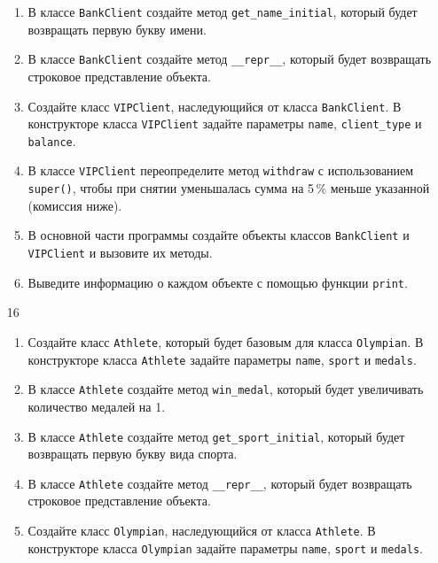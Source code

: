 \begin{enumerate}
\begin{enumerate}
    \item В классе \texttt{BankClient} создайте метод \texttt{get\_name\_initial}, который будет возвращать первую букву имени.
    
    \item В классе \texttt{BankClient} создайте метод \texttt{\_\_repr\_\_}, который будет возвращать строковое представление объекта.
    
    \item Создайте класс \texttt{VIPClient}, наследующийся от класса \texttt{BankClient}. В конструкторе класса \texttt{VIPClient} задайте параметры \texttt{name}, \texttt{client\_type} и \texttt{balance}.
    
    \item В классе \texttt{VIPClient} переопределите метод \texttt{withdraw} с использованием \texttt{super()}, чтобы при снятии уменьшалась сумма на 5\,\% меньше указанной (комиссия ниже).
    
    \item В основной части программы создайте объекты классов \texttt{BankClient} и \texttt{VIPClient} и вызовите их методы.
    
    \item Выведите информацию о каждом объекте с помощью функции \texttt{print}.
\end{enumerate}

\item[16] 
\begin{enumerate}
    \item Создайте класс \texttt{Athlete}, который будет базовым для класса \texttt{Olympian}. В конструкторе класса \texttt{Athlete} задайте параметры \texttt{name}, \texttt{sport} и \texttt{medals}.
    
    \item В классе \texttt{Athlete} создайте метод \texttt{win\_medal}, который будет увеличивать количество медалей на 1.
    
    \item В классе \texttt{Athlete} создайте метод \texttt{get\_sport\_initial}, который будет возвращать первую букву вида спорта.
    
    \item В классе \texttt{Athlete} создайте метод \texttt{\_\_repr\_\_}, который будет возвращать строковое представление объекта.
    
    \item Создайте класс \texttt{Olympian}, наследующийся от класса \texttt{Athlete}. В конструкторе класса \texttt{Olympian} задайте параметры \texttt{name}, \texttt{sport} и \texttt{medals}.
    

\end{enumerate}
\end{enumerate}
